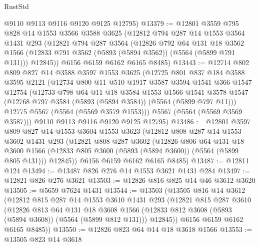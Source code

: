 \begin{lexlean}{RustStd}
\begin{coremodule}
      @9110
      @9113
      @9116
      @9120
      @9125
      @12795)
@13379 := @12801
    @3559
    @795
    @828
    @14
    @1553
    @3566
    @3588
    @3625
    (@12812
      @794
      @287
      @14
      @1553
      @3564
      @1431
      @293
      (@12821
        @794
        @287
        @3564
        (@12826
          @792
          @64
          @131
          @18
          @3562
          @1566
          (@12833 @791 @3562 (@5893 (@5894 @3562)) (@5564 (@5899 @791 @131)))
          @12845))
      @6156
      @6159
      @6162
      @6165
      @8485)
@13443 := @12714
    @802
    @809
    @827
    @14
    @3588
    @3597
    @1553
    @3625
    (@12725
      @801
      @837
      @184
      @3588
      @3595
      @2121
      (@12734
        @800
        @11
        @510
        @1917
        @3587
        @3594
        @1541
        @366
        @1547
        @12754
        (@12733
          @798
          @64
          @11
          @18
          @3584
          @1553
          @1566
          @1541
          @3578
          @1547
          (@12768 @797 @3584 (@5893 (@5894 @3584)) (@5564 (@5899 @797 @11)))
          @12775
          @5567
          (@5564 (@5569 @3579 @1553)))
        @5567
        (@5564 (@5569 @3569 @3587)))
      @9110
      @9113
      @9116
      @9120
      @9125
      @12795)
@13486 := @12801
    @3597
    @809
    @827
    @14
    @1553
    @3604
    @1553
    @3623
    (@12812
      @808
      @287
      @14
      @1553
      @3602
      @1431
      @293
      (@12821
        @808
        @287
        @3602
        (@12826
          @806
          @64
          @131
          @18
          @3600
          @1566
          (@12833 @805 @3600 (@5893 (@5894 @3600)) (@5564 (@5899 @805 @131)))
          @12845))
      @6156
      @6159
      @6162
      @6165
      @8485)
@13487 := @12811 @124
@13494 := @13487 @826 @276 @14 @1553 @3621 @1431 @284
@13497 := @12821 @826 @276 @3621
@13503 := @12826 @816 @825 @14 @46 @3612 @3620
@13505 := @5659 @7624 @1431
@13544 := @13503
    (@13505
      @816
      @14
      @3612
      (@12812
        @815
        @287
        @14
        @1553
        @3610
        @1431
        @293
        (@12821
          @815
          @287
          @3610
          (@12826
            @813
            @64
            @131
            @18
            @3608
            @1566
            (@12833 @812 @3608 (@5893 (@5894 @3608)) (@5564 (@5899 @812 @131)))
            @12845))
        @6156
        @6159
        @6162
        @6165
        @8485))
@13550 := @12826 @823 @64 @14 @18 @3618 @1566
@13553 := @13505 @823 @14 @3618

\end{coremodule}
\end{lexlean}
